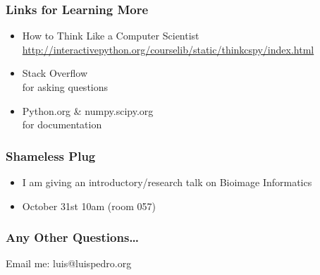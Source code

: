 \begin{frame}[fragile]
\frametitle{Links for Learning More}

\begin{itemize}
\item How to Think Like a Computer Scientist
    \url{http://interactivepython.org/courselib/static/thinkcspy/index.html}
\item Stack Overflow \\
    for asking questions
\item Python.org \& numpy.scipy.org \\
    for documentation
\end{itemize}

\end{frame}

\begin{frame}[fragile]
\frametitle{Shameless Plug}

\begin{itemize}
\item I am giving an introductory/research talk on \alert{Bioimage Informatics}
\item October 31st 10am (room 057)
\end{itemize}
\end{frame}

\begin{frame}[fragile]
\frametitle{Any Other Questions\ldots}
Email me: luis@luispedro.org
\end{frame}




